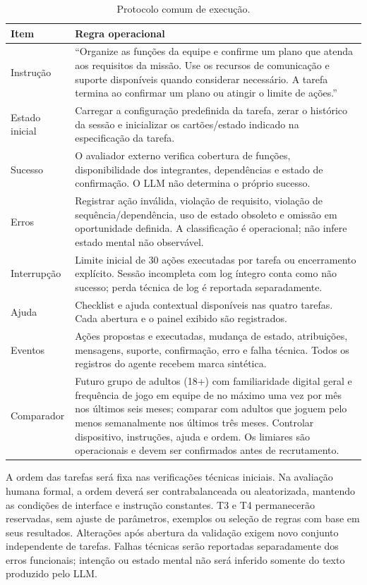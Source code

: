 \documentclass[conference]{IEEEtran}
\begin{document}
\begin{table}[!t]
\centering
\caption{Protocolo comum de execução.}
\label{tab:protocolo}
\scriptsize
\renewcommand{\arraystretch}{1.08}
\begin{tabularx}{\columnwidth}{@{}p{1.35cm}Y@{}}
\toprule
\textbf{Item} & \textbf{Regra operacional} \\
\midrule
Instrução & ``Organize as funções da equipe e confirme um plano que atenda aos requisitos da missão. Use os recursos de comunicação e suporte disponíveis quando considerar necessário. A tarefa termina ao confirmar um plano ou atingir o limite de ações.'' \\
Estado inicial & Carregar a configuração predefinida da tarefa, zerar o histórico da sessão e inicializar os cartões/estado indicado na especificação da tarefa. \\
Sucesso & O avaliador externo verifica cobertura de funções, disponibilidade dos integrantes, dependências e estado de confirmação. O LLM não determina o próprio sucesso. \\
Erros & Registrar ação inválida, violação de requisito, violação de sequência/dependência, uso de estado obsoleto e omissão em oportunidade definida. A classificação é operacional; não infere estado mental não observável. \\
Interrupção & Limite inicial de 30 ações executadas por tarefa ou encerramento explícito. Sessão incompleta com log íntegro conta como não sucesso; perda técnica de log é reportada separadamente. \\
Ajuda & Checklist e ajuda contextual disponíveis nas quatro tarefas. Cada abertura e o painel exibido são registrados. \\
Eventos & Ações propostas e executadas, mudança de estado, atribuições, mensagens, suporte, confirmação, erro e falha técnica. Todos os registros do agente recebem marca sintética. \\
Comparador & Futuro grupo de adultos (18+) com familiaridade digital geral e frequência de jogo em equipe de no máximo uma vez por mês nos últimos seis meses; comparar com adultos que joguem pelo menos semanalmente nos últimos três meses. Controlar dispositivo, instruções, ajuda e ordem. Os limiares são operacionais e devem ser confirmados antes de recrutamento. \\
\bottomrule
\end{tabularx}
\end{table}

A ordem das tarefas será fixa nas verificações técnicas iniciais. Na avaliação humana formal, a ordem deverá ser contrabalanceada ou aleatorizada, mantendo as condições de interface e instrução constantes. T3 e T4 permanecerão reservadas, sem ajuste de parâmetros, exemplos ou seleção de regras com base em seus resultados. Alterações após abertura da validação exigem novo conjunto independente de tarefas. Falhas técnicas serão reportadas separadamente dos erros funcionais; intenção ou estado mental não será inferido somente do texto produzido pelo LLM.
\end{document}
